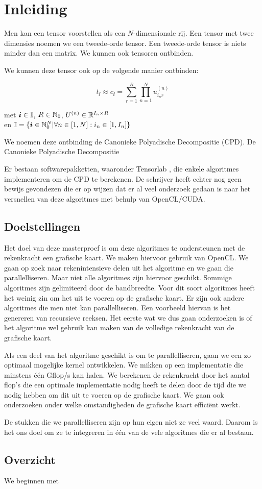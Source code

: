\chapter{Inleiding}
\label{inleiding}
Men kan een tensor voorstellen als een $N$-dimensionale rij. Een tensor met twee dimensies noemen we een tweede-orde tensor. Een tweede-orde tensor is niets minder dan een matrix. We kunnen ook tensoren ontbinden.

We kunnen deze tensor ook op de volgende manier ontbinden:

\[
    t_{\ii{}} \approx c_{\ii{}} = \sum_{r=1}^{R} \prod_{n=1}^{N} u^{(n)}_{i_{n}r}
\]
\begin{center}
met $\boldsymbol{i}{} \in \mathbb{I}$, $R \in \mathbb{N}_0$, $U^{(n)} \in \mathbb{R}^{I_n \times R}$ \\ en $ \mathbb{I} = \{\boldsymbol{i}{} \in \mathbb{N}_0^N | \forall n \in [1, N]: i_n \in [1, I_n]\}$
\end{center}

We noemen deze ontbinding de Canonieke Polyadische Decompositie (CPD). De Canonieke Polyadische Decompositie 

Er bestaan softwarepakketten, waaronder Tensorlab \cite{tensorlab}, die enkele algoritmes implementeren om de CPD te berekenen. De schrijver heeft echter nog geen bewijs gevondezen die er op wijzen dat er al veel onderzoek gedaan is naar het versnellen van deze algoritmes met behulp van OpenCL/CUDA.

\section{Doelstellingen}

Het doel van deze masterproef is om deze algoritmes te ondersteunen met de rekenkracht een grafische kaart. We maken hiervoor gebruik van OpenCL. We gaan op zoek naar rekenintensieve delen uit het algoritme en we gaan die parallelliseren. Maar niet alle algoritmes zijn hiervoor geschikt. Sommige algoritmes zijn gelimiteerd door de bandbreedte. Voor dit soort algoritmes heeft het weinig zin om het uit te voeren op de grafische kaart. Er zijn ook andere algoritmes die men niet kan parallelliseren. Een voorbeeld hiervan is het genereren van recursieve reeksen. Het eerste wat we dus gaan onderzoeken is of het algoritme wel gebruik kan maken van de volledige rekenkracht van de grafische kaart.

Als een deel van het algoritme geschikt is om te parallelliseren, gaan we een zo optimaal mogelijke kernel ontwikkelen. We mikken op een implementatie die minstens \'e\'en Gflop/s kan halen. We berekenen de rekenkracht door het aantal flop's die een optimale implementatie nodig heeft te delen door de tijd die we nodig hebben om dit uit te voeren op de grafische kaart. We gaan ook onderzoeken onder welke omstandigheden de grafische kaart effici\"ent werkt.

De stukken die we parallelliseren zijn op hun eigen niet ze veel waard. Daarom is het ons doel om ze te integreren in \'e\'en van de vele algoritmes die er al bestaan.

\section{Overzicht}
We beginnen met 